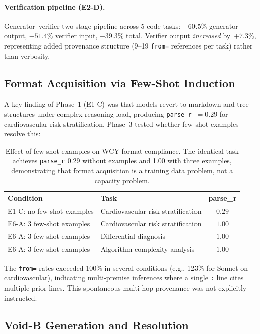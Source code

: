 \documentclass[11pt,a4paper]{article}
\begin{document}
\paragraph{Verification pipeline (E2-D).}
Generator--verifier two-stage pipeline across 5 code tasks: $-60.5\%$ generator output, $-51.4\%$ verifier input, $-39.3\%$ total. Verifier output \emph{increased} by~$+7.3\%$, representing added provenance structure (9--19 \texttt{from=} references per task) rather than verbosity.

\subsection{Format Acquisition via Few-Shot Induction}
\label{subsec:fewshot}

A key finding of Phase~1 (E1-C) was that models revert to markdown and tree structures under complex reasoning load, producing \texttt{parse\_r}~$= 0.29$ for cardiovascular risk stratification. Phase~3 tested whether few-shot examples resolve this:

\begin{table}[H]
\centering
\small
\begin{tabular}{@{}llc@{}}
\toprule
\textbf{Condition} & \textbf{Task} & \textbf{parse\_r} \\
\midrule
E1-C: no few-shot examples & Cardiovascular risk stratification & $0.29$ \\
E6-A: 3 few-shot examples  & Cardiovascular risk stratification & $1.00$ \\
E6-A: 3 few-shot examples  & Differential diagnosis             & $1.00$ \\
E6-A: 3 few-shot examples  & Algorithm complexity analysis      & $1.00$ \\
\bottomrule
\end{tabular}
\caption{Effect of few-shot examples on WCY format compliance. The identical task achieves \texttt{parse\_r} 0.29 without examples and 1.00 with three examples, demonstrating that format acquisition is a training data problem, not a capacity problem.}
\label{tab:fewshot}
\end{table}

The \texttt{from=} rates exceeded 100\% in several conditions (e.g., 123\% for Sonnet on cardiovascular), indicating multi-premise inferences where a single \texttt{:} line cites multiple prior lines. This spontaneous multi-hop provenance was not explicitly instructed.

\subsection{Void-B Generation and Resolution}
\label{subsec:voidb}
\end{document}
